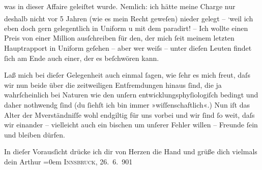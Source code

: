                was in dieser Affaire geleiſtet wurde. Nemlich: ich hätte meine {\pb}Charge nur deshalb
               nicht vor 5 Jahren (wie es mein Recht geweſen) nieder gelegt – \substVorne{}\textsuperscript{,}\substDazwischen{}weil\substHinten{} ich eben doch gern gelegentlich in Uniform \introOben{}u\introOben{} mit
               dem \label{K_L01134-2v}\label{K_L01134-2} paradirt! – Ich wollte einen Preis von einer Million
               ausſchreiben für den, der mich ſeit meinem letzten Hauptrapport in Uniform geſehen –
               aber wer weiſs – unter dieſen Leuten findet ſich am Ende auch einer, der es
               beſchwören kann.\pend
           
\pstart
           Laß mich bei dieſer Gelegenheit auch einmal ſagen, wie ſehr es {\pb}mich freut, daſs wir
               nun beide über die \label{LL036-1v}zeitweiligen
                  Entfremdungen\label{LL036-1h} hinaus ſind, die ja wahrſcheinlich bei Naturen wie den
               unſern entwicklungsphyſiologiſch bedingt und daher nothwendg ſind (du ſiehſt ich bin
               immer »wiſſenschaftlich«.) Nun iſt das Alter der Mverständniſſe wohl endgiltig für uns vorbei und wir ſind ſo weit, daſs wir
               einander – vielleicht auch ein bischen um unſerer Fehler willen – Freunde ſein und
                  {\pb}bleiben dürfen.\pend
           
\pstart
           In dieſer Vorausſicht drücke ich dir von Herzen die Hand und grüße dich
               vielmals{\\[\baselineskip]} dein \spacefill\mbox{Arthur}\pend
           \leftskip=0em{}
\pstart
           \textsc{Innsbruck}, 26. 6. 901\pend
           \endnumbering{}  
      